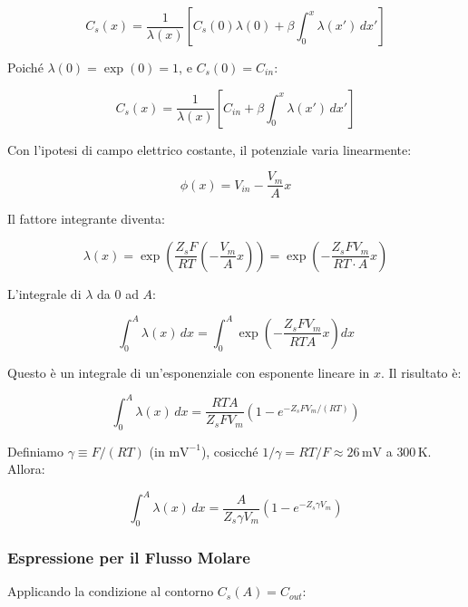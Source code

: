 \begin{equation}
C_s(x) = \frac{1}{\lambda(x)}\left[C_s(0)\lambda(0) + \beta\int_0^x \lambda(x')\,dx'\right]
\end{equation}

Poiché $\lambda(0) = \exp(0) = 1$, e $C_s(0) = C_{in}$:

\begin{equation}
C_s(x) = \frac{1}{\lambda(x)}\left[C_{in} + \beta\int_0^x \lambda(x')\,dx'\right]
\end{equation}

Con l'ipotesi di campo elettrico costante, il potenziale varia linearmente:

\begin{equation}
\phi(x) = V_{in} - \frac{V_m}{A}x
\end{equation}

Il fattore integrante diventa:

\begin{equation}
\lambda(x) = \exp\left(\frac{Z_s F}{RT}\left(-\frac{V_m}{A}x\right)\right) = \exp\left(-\frac{Z_s F V_m}{RT \cdot A}x\right)
\end{equation}

L'integrale di $\lambda$ da 0 ad $A$:

\begin{equation}
\int_0^A \lambda(x)\,dx = \int_0^A \exp\left(-\frac{Z_s F V_m}{RT A}x\right)dx
\end{equation}

Questo è un integrale di un'esponenziale con esponente lineare in $x$. Il risultato è:

\begin{equation}
\int_0^A \lambda(x)\,dx = \frac{RT A}{Z_s F V_m}\left(1 - e^{-Z_s F V_m/(RT)}\right)
\end{equation}

Definiamo $\gamma \equiv F/(RT)$ (in $\text{mV}^{-1}$), cosicché $1/\gamma = RT/F \approx 26\,\text{mV}$ a $300\,\text{K}$. Allora:

\begin{equation}
\int_0^A \lambda(x)\,dx = \frac{A}{Z_s \gamma V_m}\left(1 - e^{-Z_s \gamma V_m}\right)
\end{equation}

\subsubsection{Espressione per il Flusso Molare}

Applicando la condizione al contorno $C_s(A) = C_{out}$:


